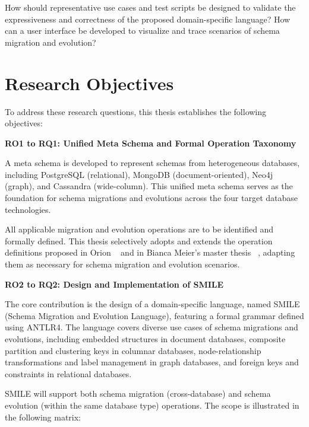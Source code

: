 How should representative use cases and test scripts be designed to validate the expressiveness and correctness of the proposed domain-specific language? How can a user interface be developed to visualize and trace scenarios of schema migration and evolution?
%
%
\section{Research Objectives}
\label{sec:objectivesl}
To address these research questions, this thesis establishes the following objectives:

\textbf{RO1 to RQ1: Unified Meta Schema and Formal Operation Taxonomy}

A meta schema is developed to represent schemas from heterogeneous databases, including PostgreSQL (relational), MongoDB (document-oriented), Neo4j (graph), and Cassandra (wide-column). This unified meta schema serves as the foundation for schema migrations and evolutions across the four target database technologies.

All applicable migration and evolution operations are to be identified and formally defined. This thesis selectively adopts and extends the operation definitions proposed in Orion ~\cite{chillon2022taxonomy} and in Bianca Meier's master thesis ~\cite{meier2023datenmigration}, adapting them as necessary for schema migration and evolution scenarios.

\textbf{RO2 to RQ2: Design and Implementation of SMILE }

The core contribution is the design of a domain-specific language, named SMILE  (Schema Migration and Evolution Language), featuring a formal grammar defined using ANTLR4. The language covers diverse use cases of schema migrations and evolutions, including embedded structures in document databases, composite partition and clustering keys in columnar databases, node-relationship transformations and label management in graph databases, and foreign keys and constraints in relational databases.

SMILE  will support both schema migration (cross-database) and schema evolution (within the same database type) operations. The scope is illustrated in the following matrix:

